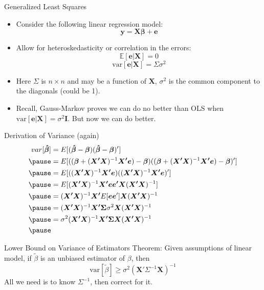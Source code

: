 \documentclass[aspectratio=169, handout]{beamer}
\numberwithin{equation}{section}
\begin{document}
\begin{frame}{Generalized Least Squares}
\begin{itemize}
\item Consider the following linear regression model:
$$\bm{y}=\bm{X\beta}+\bm{e}$$
\item Allow for heteroskedasticity or correlation in the errors:
$$\mathbb{E}[\bm{e}|\bm{X}]=0$$
$$\text{var}[\bm{e}|\bm{X}]=\Sigma\sigma^2$$
\item Here $\Sigma$ is $n\times n$ and may be a function of $\bm{X}$, $\sigma^2$ is the common component to the diagonals (could be 1).
\item Recall, Gauss-Markov proves we can do no better than OLS when $\text{var}[\bm{e}|\bm{X}]=\sigma^2\bm{I}$.  But now we can do better.
\end{itemize}
\end{frame}

\begin{frame}{Derivation of Variance (again)}
\begin{align*}
var[\bm{\hat{\beta}}]&=E[(\bm{\hat{\beta}}-\bm{\beta})(\bm{\hat{\beta}}-\bm{\beta})']\\ \pause
&=E[((\bm{\beta}+(\bm{X'X})^{-1}\bm{X'e})-\bm{\beta})((\bm{\beta}+(\bm{X'X})^{-1}\bm{X'e})-\bm{\beta})']\\ \pause
&=E[((\bm{X'X})^{-1}\bm{X'e})((\bm{X'X})^{-1}\bm{X'e})']\\ \pause
&=E[(\bm{X'X})^{-1}\bm{X'e}\bm{e'X}(\bm{X'X})^{-1}]\\ \pause
&=(\bm{X'X})^{-1}\bm{X'}E[\bm{e}\bm{e}']\bm{X}(\bm{X'X})^{-1}\\ \pause
&=(\bm{X'X})^{-1}\bm{X'}\bm{\Sigma}\sigma^2\bm{X}(\bm{X'X})^{-1}\\ \pause
&=\sigma^2(\bm{X'X})^{-1}\bm{X'}\bm{\Sigma}\bm{X}(\bm{X'X})^{-1}\\ \pause
\end{align*}
\end{frame}

\begin{frame}{Lower Bound on Variance of Estimators}
Theorem: Given assumptions of linear model, if $\tilde{\beta}$ is an unbiased estimator of $\beta$, then 
$$\text{var}[\tilde{\beta}]\geq\sigma^2(\bm{X}'\Sigma^{-1}\bm{X})^{-1}$$
All we need is to know $\Sigma^{-1}$, then correct for it.
\end{frame}
\end{document}
